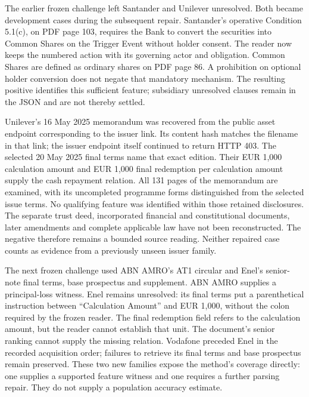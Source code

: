 \documentclass[
  11pt,
]{article}
\begin{document}
The earlier frozen challenge left Santander and Unilever unresolved.
Both became development cases during the subsequent repair. Santander's
operative Condition 5.1(c), on PDF page 103, requires the Bank to
convert the securities into Common Shares on the Trigger Event without
holder consent. The reader now keeps the numbered action with its
governing actor and obligation. Common Shares are defined as ordinary
shares on PDF page 86. A prohibition on optional holder conversion does
not negate that mandatory mechanism. The resulting positive identifies
this sufficient feature; subsidiary unresolved clauses remain in the
JSON and are not thereby settled.

Unilever's 16 May 2025 memorandum was recovered from the public asset
endpoint corresponding to the issuer link. Its content hash matches the
filename in that link; the issuer endpoint itself continued to return
HTTP 403. The selected 20 May 2025 final terms name that exact edition.
Their EUR 1,000 calculation amount and EUR 1,000 final redemption per
calculation amount supply the cash repayment relation. All 131 pages of
the memorandum are examined, with its uncompleted programme forms
distinguished from the selected issue terms. No qualifying feature was
identified within those retained disclosures. The separate trust deed,
incorporated financial and constitutional documents, later amendments
and complete applicable law have not been reconstructed. The negative
therefore remains a bounded source reading. Neither repaired case counts
as evidence from a previously unseen issuer family.

The next frozen challenge used ABN AMRO's AT1 circular and Enel's
senior-note final terms, base prospectus and supplement. ABN AMRO
supplies a principal-loss witness. Enel remains unresolved: its final
terms put a parenthetical instruction between ``Calculation Amount'' and
EUR 1,000, without the colon required by the frozen reader. The final
redemption field refers to the calculation amount, but the reader cannot
establish that unit. The document's senior ranking cannot supply the
missing relation. Vodafone preceded Enel in the recorded acquisition
order; failures to retrieve its final terms and base prospectus remain
preserved. These two new families expose the method's coverage directly:
one supplies a supported feature witness and one requires a further
parsing repair. They do not supply a population accuracy estimate.
\end{document}
